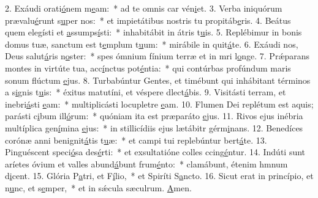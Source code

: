 2. Exáudi orati\uline{ó}nem m\uline{e}am:~* ad te omnis car vén\uline{i}et.
3. Verba iniquórum prævalu\uline{é}runt s\uline{u}per nos:~* et impietátibus nostris tu propitáb\uline{e}ris.
4. Beátus quem elegísti et \uline{a}ssumps\uline{í}sti:~* inhabitábit in átris t\uline{u}is.
5. Replébimur in bonis domus tuæ, sanctum est t\uline{e}mplum t\uline{u}um:~* mirábile in quit\uline{á}te.
6. Exáudi nos, Deus salut\uline{á}ris n\uline{o}ster:~* spes ómnium fínium terræ et in mri l\uline{o}nge.
7. Prǽparans montes in virtúte tua, acc\uline{í}nctus pot\uline{é}ntia:~* qui contúrbas profúndum maris sonum flúctum \uline{e}jus.
8. Turbabúntur Gentes, et timébunt qui inhábitant términos a s\uline{i}gnis t\uline{u}is:~* éxitus matutíni, et véspere dlect\uline{á}bis.
9. Visitásti terram, et inebri\uline{á}sti \uline{e}am:~* multiplicásti locupletre \uline{e}am.
10. Flumen Dei replétum est aquis; parásti c\uline{i}bum ill\uline{ó}rum:~* quóniam ita est præparáto \uline{e}jus.
11. Rivos ejus inébria multíplica gen\uline{í}mina \uline{e}jus:~* in stillicídiis ejus lætábitr gérm\uline{i}nans.
12. Benedíces corónæ anni benignit\uline{á}tis t\uline{u}æ:~* et campi tui replebúntur bert\uline{á}te.
13. Pinguéscent speci\uline{ó}sa des\uline{é}rti:~* et exsultatióne colles ccing\uline{é}ntur.
14. Indúti sunt aríetes óvium et valles abund\uline{á}bunt frum\uline{é}nto:~* clamábunt, étenim hmnum d\uline{i}cent.
15. Glória P\uline{a}tri, et F\uline{í}lio,~* et Spiríti S\uline{a}ncto.
16. Sicut erat in princípio, et n\uline{u}nc, et s\uline{e}mper,~* et in sǽcula sæculrum. \uline{A}men.
